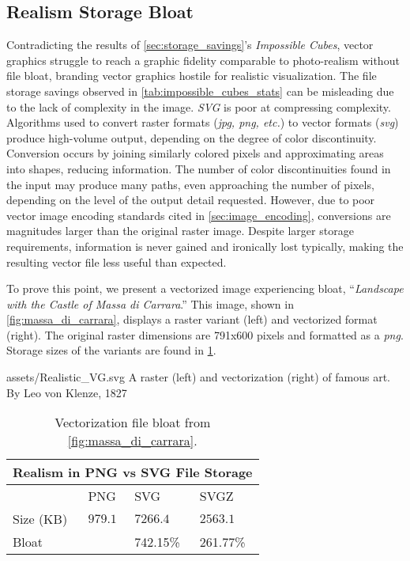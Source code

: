 \subsection{Realism Storage Bloat}
Contradicting the results of \cref{sec:storage_savings}'s \textit{Impossible Cubes}, vector graphics struggle to reach a graphic fidelity comparable to photo-realism without file bloat, branding vector graphics hostile for realistic visualization. The file storage savings observed in \cref{tab:impossible_cubes_stats} can be misleading due to the lack of complexity in the image. \textit{SVG} is poor at compressing complexity. Algorithms used to convert raster formats (\textit{jpg, png, etc.}) to vector formats (\textit{svg}) produce high-volume output, depending on the degree of color discontinuity. Conversion occurs by joining similarly colored pixels and approximating areas into shapes, reducing information. The number of color discontinuities found in the input may produce many paths, even approaching the number of pixels, depending on the level of the output detail requested. However, due to poor vector image encoding standards  cited in \cref{sec:image_encoding}, conversions are magnitudes larger than the original raster image. Despite larger storage requirements, information is never gained and ironically lost typically, making the resulting vector file less useful than expected.\medskip

To prove this point, we present a vectorized image experiencing bloat, ``\textit{Landscape with the Castle of Massa di Carrara}.'' This image, shown in \cref{fig:massa_di_carrara}, displays a raster variant (left) and vectorized format (right). The original raster dimensions are 791x600 pixels and formatted as a \textit{png}. Storage sizes of the variants are found in \cref{tab:massa_di_carrara}.\medskip

\widesvg
{assets/Realistic_VG.svg}
{\label{fig:massa_di_carrara}A raster (left) and vectorization (right) of famous art.}
{By Leo von Klenze, 1827}\medskip

\begin{table}[H]
\centering
\begin{tabular}{ |p{2cm}||p{2cm}|p{2cm}|p{2cm}| }
\hline
\multicolumn{4}{|c|}{Realism in PNG vs SVG File Storage}\\
\hline
&PNG&SVG&SVGZ\\
\hline
Size (KB)&$979.1$&$7266.4$&$2563.1$\\
\hline
Bloat&&742.15\%&261.77\%\\
\hline
\end{tabular}
\caption{\label{tab:massa_di_carrara}Vectorization file bloat from \cref{fig:massa_di_carrara}.}
\end{table}

